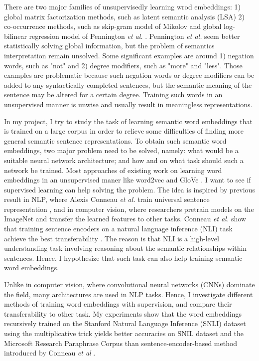 \documentclass{article}
\newcommand{\etal}{\emph{et al. }}
\begin{document}
There are two major families of unsupervisedly learning wrod embeddings: 1) global matrix factorization methods, such as latent semantic analysis (LSA) \cite{deerwester1990indexing} 2) co-occurrence methods, such as skip-gram model of Mikolov  \cite{mikolov2013distributed} and global log-bilinear regression model of Pennington \etal \cite{pennington2014glove}. Pennington \etal seem better statistically solving global information, but the problem of semantics interpretation remain unsolved. Some significant examples are around 1) negation words, such as "not" and 2) degree modifiers, such as "more" and "less". Those examples are problematic because such negation words or degree modifiers can be added to any syntactically completed sentences, but the semantic meaning of the sentence may be altered for a certain degree. Training such words in an unsupervised manner is unwise and usually result in meaningless representations.

In my project, I try to study the task of learning semantic word embeddings that is trained on a large corpus in order to relieve some difficulties of finding more general semantic sentence representations. To obtain such semantic word embeddings, two major problem need to be solved, namely: what would be a suitable neural network architecture; and how and on what task should such a network be trained. Most approaches of existing work on learning word embeddings in an unsupervised maner like word2vec \cite{mikolov2013distributed} and GloVe \cite{pennington2014glove}. I want to see if supervised learning can help solving the problem. The idea is inspired by previous result in NLP, where Alexis Conneau \etal train universal sentence representation \cite{conneau2017supervised}, and in computer vision, where researchers pretrain models on the ImageNet \cite{deng2009imagenet} and transfer the learned features to other tasks. Conneau \etal show that training sentence encoders on a natural language inference (NLI) task achieve the best transferability \cite{conneau2017supervised}. The reason is that NLI is a high-level understanding task involving reasoning about the semantic relationships within sentences. Hence, I hypothesize that such task can also help training semantic word embeddings.

Unlike in computer vision, where convolutional neural networks (CNNs) dominate the field, many architectures are used in NLP tasks. Hence, I investigate different methods of training word embeddings with supervision, and compare their transferability to other task. My experiments show that the word embeddings recursively trained on the Stanford Natural Language Inference (SNLI) dataset \cite{bowman2015large} using the multiplicative trick yields better accuracies on  SNIL dataset and the Microsoft Research Paraphrase Corpus than sentence-encoder-based method introduced by Conneau \emph{et al} \cite{conneau2017supervised}.
\end{document}
